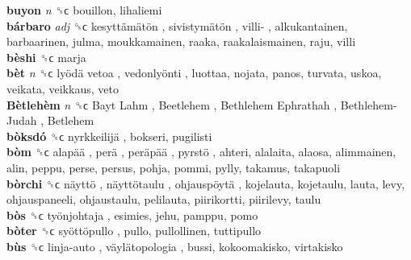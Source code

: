 \textbf{buyon} \emph{n}  ␝ϲ  bouillon, lihaliemi  \\
\textbf{bárbaro} \emph{adj}  ␝ϲ   kesyttämätön ,  sivistymätön ,  villi- , alkukantainen, barbaarinen, julma, moukkamainen, raaka, raakalaismainen, raju, villi  \\
\textbf{bèshi} ␝ϲ  marja  \\
\textbf{bèt} \emph{n}  ␝ϲ   lyödä vetoa ,  vedonlyönti , luottaa, nojata, panos, turvata, uskoa, veikata, veikkaus, veto  \\
\textbf{Bètlehèm} \emph{n}  ␝ϲ   Bayt Lahm ,  Beetlehem ,  Bethlehem Ephrathah ,  Bethlehem-Judah ,  Betlehem   \\
\textbf{bòksdó} ␝ϲ   nyrkkeilijä , bokseri, pugilisti  \\
\textbf{bòm} ␝ϲ   alapää ,  perä ,  peräpää ,  pyrstö , ahteri, alalaita, alaosa, alimmainen, alin, peppu, perse, persus, pohja, pommi, pylly, takamus, takapuoli  \\
\textbf{bòrchi} ␝ϲ   näyttö ,  näyttötaulu ,  ohjauspöytä , kojelauta, kojetaulu, lauta, levy, ohjauspaneeli, ohjaustaulu, pelilauta, piirikortti, piirilevy, taulu  \\
\textbf{bòs} ␝ϲ   työnjohtaja , esimies, jehu, pamppu, pomo  \\
\textbf{bòter} ␝ϲ   syöttöpullo , pullo, pullollinen, tuttipullo  \\
\textbf{bùs} ␝ϲ   linja-auto ,  väylätopologia , bussi, kokoomakisko, virtakisko  \\
